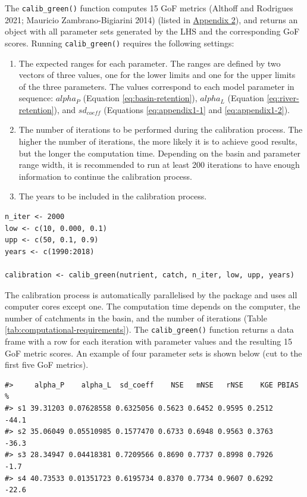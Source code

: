 The \texttt{calib\_green()} function computes 15 GoF metrics (Althoff and Rodrigues 2021; Mauricio Zambrano-Bigiarini 2014) (listed in \protect\hyperlink{appendix-2}{Appendix 2}), and returns an object with all parameter sets generated by the LHS and the corresponding GoF scores. Running \texttt{calib\_green()} requires the following settings:

\begin{enumerate}
\def\labelenumi{\arabic{enumi}.}
\item
  The expected ranges for each parameter. The ranges are defined by two vectors of three values, one for the lower limits and one for the upper limits of the three parameters. The values correspond to each model parameter in sequence: \(alpha_P\) (Equation \eqref{eq:basin-retention}), \(alpha_L\) (Equation \eqref{eq:river-retention}), and \(sd_{coeff}\) (Equations \eqref{eq:appendix1-1} and \eqref{eq:appendix1-2}).
\item
  The number of iterations to be performed during the calibration process. The higher the number of iterations, the more likely it is to achieve good results, but the longer the computation time. Depending on the basin and parameter range width, it is recommended to run at least 200 iterations to have enough information to continue the calibration process.
\item
  The years to be included in the calibration process.
\end{enumerate}

\begin{verbatim}
n_iter <- 2000  
low <- c(10, 0.000, 0.1)   
upp <- c(50, 0.1, 0.9)    
years <- c(1990:2018)

calibration <- calib_green(nutrient, catch, n_iter, low, upp, years)
\end{verbatim}

\noindent The calibration process is automatically parallelised by the package and uses all computer cores except one. The computation time depends on the computer, the number of catchments in the basin, and the number of iterations (Table \ref{tab:computational-requirements}). The \texttt{calib\_green()} function returns a data frame with a row for each iteration with parameter values and the resulting 15 GoF metric scores. An example of four parameter sets is shown below (cut to the first five GoF metrics).

\begin{verbatim}
#>     alpha_P    alpha_L  sd_coeff    NSE   mNSE   rNSE    KGE PBIAS %
#> s1 39.31203 0.07628558 0.6325056 0.5623 0.6452 0.9595 0.2512   -44.1
#> s2 35.06049 0.05510985 0.1577470 0.6733 0.6948 0.9563 0.3763   -36.3
#> s3 28.34947 0.04418381 0.7209566 0.8690 0.7737 0.8998 0.7926    -1.7
#> s4 40.73533 0.01351723 0.6195734 0.8370 0.7734 0.9607 0.6292   -22.6
\end{verbatim}

